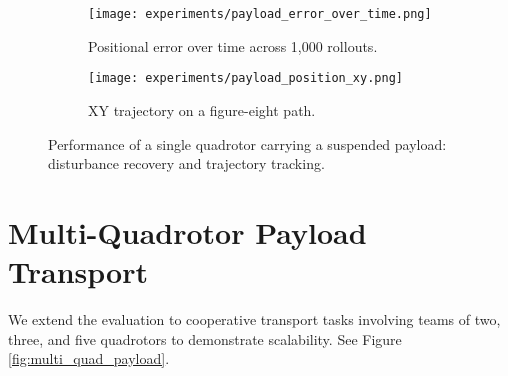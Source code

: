 \begin{figure}[ht]
    \centering
    \begin{subfigure}[b]{0.49\textwidth}
        \texttt{[image: experiments/payload\_error\_over\_time.png]}
        \caption{Positional error over time across 1,000 rollouts.}
        \label{fig:payload_error_over_time}
    \end{subfigure}
    \hfill
    \begin{subfigure}[b]{0.49\textwidth}
        \texttt{[image: experiments/payload\_position\_xy.png]}
        \caption{XY trajectory on a figure-eight path.}
        \label{fig:payload_position_xy}
    \end{subfigure}
    \caption{Performance of a single quadrotor carrying a suspended payload: disturbance recovery and trajectory tracking.}
    \label{fig:single_quad_payload_subfigs}
\end{figure}

\section{Multi-Quadrotor Payload Transport}
We extend the evaluation to cooperative transport tasks involving teams of two, three, and five quadrotors to demonstrate scalability. See Figure \ref{fig:multi_quad_payload}.

